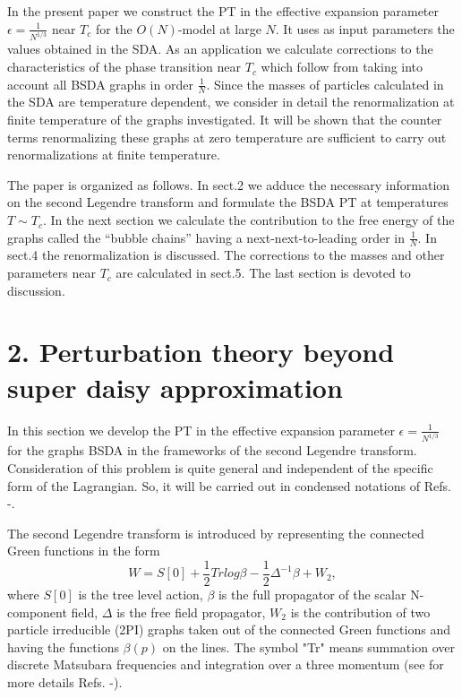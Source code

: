 \documentclass[a4paper,12pt]{article}
\begin{document}
In the present paper we construct the PT in the effective expansion
parameter $\epsilon = \frac{1}{N^{1/3}} $ near $T_c$ for the
$O(N)$-model at large $N$. It uses as input parameters the values
obtained in the SDA. As an application we calculate corrections to the
characteristics of the phase transition near $T_c$ which follow from
taking into account all BSDA graphs in order $\frac{1}{N}$.  Since
the masses of particles calculated in the SDA are temperature
dependent, we consider in detail the renormalization at finite
temperature of the graphs investigated. It will be shown that the
counter terms renormalizing these graphs at zero temperature are
sufficient to carry out renormalizations at finite temperature.

The paper is organized as follows. In sect.2 we adduce the necessary
information on the second Legendre transform and formulate the BSDA PT
at temperatures $T \sim T_c$.  In the next section we calculate the
contribution to the free energy of the graphs called the ``bubble chains''
having a next-next-to-leading order in $\frac{1}{N}$. In sect.4 the
renormalization is discussed. The corrections to the masses and other
parameters near $T_c$ are calculated in sect.5. The last section is
devoted to discussion.

\section*{2. Perturbation theory beyond super daisy approximation}
In this section we develop the PT in the effective expansion parameter
$\epsilon = \frac{1}{N^{1/3}}$ for the graphs BSDA in the frameworks
of the second Legendre transform. Consideration of this problem is
quite general and independent of the specific form of the
Lagrangian. So, it will be carried out in condensed notations of
Refs. \cite{Bordag1}-\cite{pl}.

The second Legendre transform is introduced by  representing  
the connected Green functions in the form
\begin{equation} \label{slt}
W = S[0] + \frac{1}{2} Tr log \beta - \frac{1}{2} \Delta^{-1} \beta +
W_2,
\end{equation}
where $S[0]$ is the tree level action, $\beta$ is the full propagator
of the scalar N-component field, $\Delta $ is the free field
propagator, $W_2$ is the contribution of two particle irreducible
(2PI) graphs taken out of the connected Green functions and having the
functions $\beta(p)$ on the lines. The symbol "Tr" means summation
over discrete Matsubara frequencies and integration over a three
momentum (see for more details Refs. \cite{Bordag1}-\cite{pl}).
\end{document}
